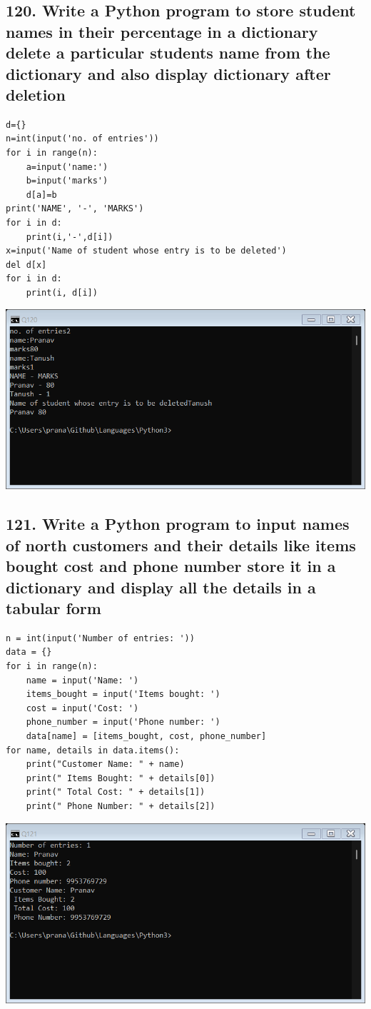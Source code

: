 \documentclass[12pt]{article}
\begin{document}
\subsection*{120. Write a Python program to store student
names in their percentage in a dictionary delete a
particular students name from the dictionary and
also display dictionary after deletion}
\begin{verbatim}
d={}
n=int(input('no. of entries'))
for i in range(n):
 	a=input('name:')
 	b=input('marks')
 	d[a]=b
print('NAME', '-', 'MARKS')
for i in d:
 	print(i,'-',d[i])
x=input('Name of student whose entry is to be deleted')
del d[x]
for i in d:
 	print(i, d[i])
\end{verbatim}
\includegraphics[width=\linewidth]{images/120.png}

\subsection*{121.  Write a Python program to input names of
north customers and their details like items
bought cost and phone number store it in a
dictionary and display all the details in a tabular
form}
\begin{verbatim}
n = int(input('Number of entries: '))
data = {}
for i in range(n):
    name = input('Name: ')
    items_bought = input('Items bought: ')
    cost = input('Cost: ')
    phone_number = input('Phone number: ')	
    data[name] = [items_bought, cost, phone_number]
for name, details in data.items():
    print("Customer Name: " + name)
    print(" Items Bought: " + details[0])
    print(" Total Cost: " + details[1])
    print(" Phone Number: " + details[2])
\end{verbatim}
\includegraphics[width=\linewidth]{images/121.png}
\end{document}
